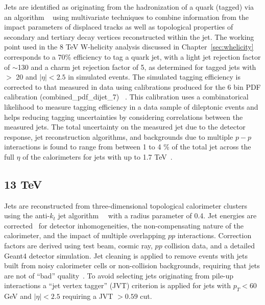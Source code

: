 Jets are identified as originating from the hadronization of a \bt quark (\bt tagged) via an algorithm ~\cite{Aad:2015ydr} using multivariate techniques to combine information from the impact parameters of displaced tracks as well as topological properties of secondary and tertiary decay vertices reconstructed within the jet. The working point used in the 8 TeV W-helicity analysis discussed in Chapter~\ref{sec:whelicity} corresponds to a 70\% efficiency to tag a \bt quark jet, with a light jet rejection factor of $\sim$130 and a charm jet rejection factor of 5, as determined for \bt tagged jets with \pt $>$ 20 \gev and $|\eta|<2.5$ in simulated \ttbar events. The simulated \bt tagging efficiency is corrected to that measured in data using calibrations produced for the 6 bin \ttbar PDF calibration (combined\_pdf\_dijet\_7) ~\cite{ATLAS-CONF-2014-004}. This calibration uses a combinatorical likelihood to measure \bt tagging efficiency in a data sample of dileptonic \ttbar events and helps reducing \bt tagging uncertainties by considering correlations between the measured jets. The total uncertainty on the measured jet \pt due to the detector response, jet reconstruction algorithms, and backgrounds due to multiple $p-p$ interactions is found to range from between 1 to 4 \% of the total jet \pt across the full $\eta$ of the calorimeters for jets with \pt up to 1.7 TeV~\cite{ATLAS-CONF-2015-017}.

\subsection{13 TeV}
Jets are reconstructed from three-dimensional topological calorimeter clusters~\cite{ATLAS-TopoClustering} using the anti-$k_t$ jet algorithm~~\cite{ref:Cacciari2008} with a radius parameter of 0.4. Jet energies are corrected~\cite{ATLAS-JES-RUN2} for detector inhomogeneities, the non-compensating nature of the calorimeter, and the impact of multiple overlapping $pp$ interactions. Correction factors are derived using test beam, cosmic ray, $pp$ collision data, and a detailed Geant4 detector simulation. Jet cleaning is applied to remove events with jets built from noisy calorimeter cells or non-collision backgrounds, requiring that jets are not of ``bad'' quality~\cite{ATLAS-JVTPaper}. %
To avoid selecting jets originating from pile-up interactions a ``jet vertex tagger'' (JVT) criterion is applied for jets with $p_T < 60$ GeV and $|\eta| < 2.5$ requiring a JVT $ > 0.59$ cut. %

